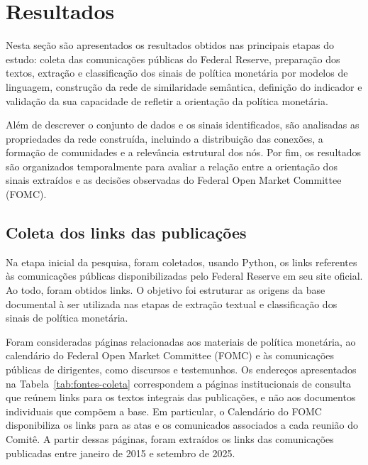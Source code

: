 \newpage
\chapter{Resultados}


Nesta seção são apresentados os resultados obtidos nas principais etapas do
estudo: coleta das comunicações públicas do Federal Reserve, preparação dos
textos, extração e classificação dos sinais de política monetária por modelos
de linguagem, construção da rede de similaridade semântica, 
definição do indicador e validação da sua capacidade de refletir a orientação 
da política monetária.

Além de descrever o conjunto de dados e os sinais identificados, são analisadas
as propriedades da rede construída, incluindo a distribuição das conexões, a
formação de comunidades e a relevância estrutural dos nós. Por fim, os resultados
são organizados temporalmente para avaliar a relação entre a orientação dos sinais
extraídos e as decisões observadas do Federal Open Market Committee (FOMC).

\section{Coleta dos links das publicações}

Na etapa inicial da pesquisa, foram coletados, usando Python, os links referentes às comunicações
públicas disponibilizadas pelo Federal Reserve em seu site oficial. Ao todo, foram
obtidos \LinkCount links. O objetivo
foi estruturar as origens da base documental à ser utilizada nas etapas de extração textual e 
classificação dos sinais de política monetária.

Foram consideradas páginas relacionadas aos materiais de política monetária, ao
calendário do Federal Open Market Committee (FOMC) e às comunicações públicas de
dirigentes, como discursos e testemunhos. Os endereços apresentados na
Tabela~\ref{tab:fontes-coleta} correspondem a páginas institucionais de consulta
que reúnem links para os textos integrais das publicações, e não aos documentos
individuais que compõem a base. Em particular, o Calendário do FOMC disponibiliza
os links para as atas e os comunicados associados a cada reunião do Comitê. A partir
dessas páginas, foram extraídos os links das comunicações publicadas entre janeiro
de 2015 e setembro de 2025. 


